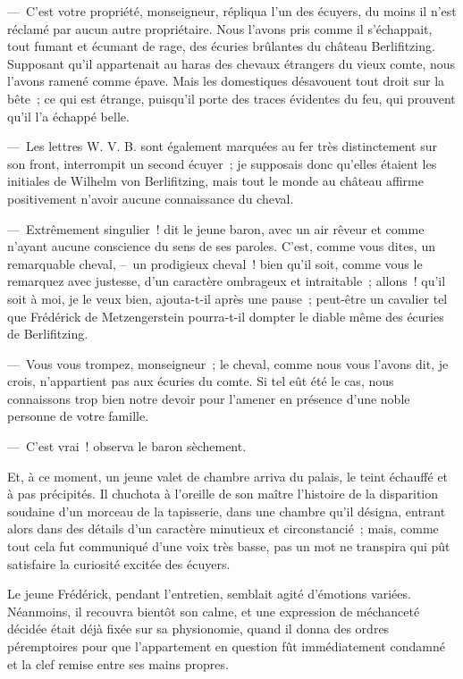 \documentclass[french,twoside]{book} %
\begin{document}
— C’est votre propriété, monseigneur, répliqua l’un des écuyers, du moins il n’est réclamé par aucun autre propriétaire. Nous l’avons pris comme il s’échappait, tout fumant et écumant de rage, des écuries brûlantes du château Berlifitzing. Supposant qu’il appartenait au haras des chevaux étrangers du vieux comte, nous l’avons ramené comme épave. Mais les domestiques désavouent tout droit sur la bête ; ce qui est étrange, puisqu’il porte des traces évidentes du feu, qui prouvent qu’il l’a échappé belle.\par
— Les lettres W. V. B. sont également marquées au fer très distinctement sur son front, interrompit un second écuyer ; je supposais donc qu’elles étaient les initiales de Wilhelm von Berlifitzing, mais tout le monde au château affirme positivement n’avoir aucune connaissance du cheval.\par
— Extrêmement singulier ! dit le jeune baron, avec un air rêveur et comme n’ayant aucune conscience du sens de ses paroles. C’est, comme vous dites, un remarquable cheval, – un prodigieux cheval ! bien qu’il soit, comme vous le remarquez avec justesse, d’un caractère ombrageux et intraitable ; allons ! qu’il soit à moi, je le veux bien, ajouta-t-il après une pause ; peut-être un cavalier tel que Frédérick de Metzengerstein pourra-t-il dompter le diable même des écuries de Berlifitzing.\par
— Vous vous trompez, monseigneur ; le cheval, comme nous vous l’avons dit, je crois, n’appartient pas aux écuries du comte. Si tel eût été le cas, nous connaissons trop bien notre devoir pour l’amener en présence d’une noble personne de votre famille.\par
— C’est vrai ! observa le baron sèchement.\par
Et, à ce moment, un jeune valet de chambre arriva du palais, le teint échauffé et à pas précipités. Il chuchota à l’oreille de son maître l’histoire de la disparition soudaine d’un morceau de la tapisserie, dans une chambre qu’il désigna, entrant alors dans des détails d’un caractère minutieux et circonstancié ; mais, comme tout cela fut communiqué d’une voix très basse, pas un mot ne transpira qui pût satisfaire la curiosité excitée des écuyers.\par
Le jeune Frédérick, pendant l’entretien, semblait agité d’émotions variées. Néanmoins, il recouvra bientôt son calme, et une expression de méchanceté décidée était déjà fixée sur sa physionomie, quand il donna des ordres péremptoires pour que l’appartement en question fût immédiatement condamné et la clef remise entre ses mains propres.\par
\end{document}
